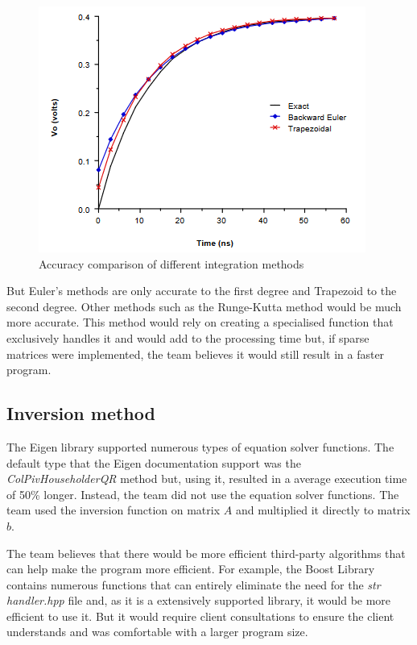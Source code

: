 \documentclass[12pt,a4paper]{article}
\begin{document}
\begin{figure} [h!]
	\centering
	\includegraphics[]{Integration.PNG}
	\caption{Accuracy comparison of different integration methods \cite{integration}}
\end{figure}
\par
But Euler's methods are only accurate to the first degree and Trapezoid to the second degree.
Other methods such as the Runge-Kutta method would be much more accurate.
This method would rely on creating a specialised function that exclusively handles it and would add to the processing time but,
if sparse matrices were implemented, the team believes it would still result in a faster program.

\subsection{Inversion method}
The Eigen library supported numerous types of equation solver functions. The default type that the Eigen documentation support was the 
\textit{ColPivHouseholderQR} method but, using it, resulted in a average execution time of 50\% longer. Instead, the team 
did not use the equation solver functions. The team used the inversion function on matrix $A$ and multiplied it directly to matrix $b$.
\par 
The team believes that there would be more efficient third-party algorithms that can help make the program more efficient. For example, 
the Boost Library contains numerous functions that can entirely eliminate the need for the \textit{str handler.hpp} file and,
as it is a extensively supported library, it would be more efficient to use it. But it would require client consultations to ensure
the client understands and was comfortable with a larger program size. 
\pagebreak
\end{document}
